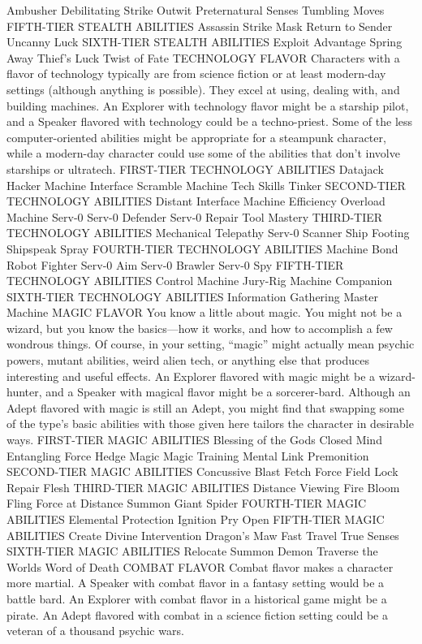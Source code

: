 Ambusher
Debilitating Strike
Outwit
Preternatural Senses
Tumbling Moves
FIFTH-TIER STEALTH ABILITIES
Assassin Strike
Mask
Return to Sender
Uncanny Luck
SIXTH-TIER STEALTH ABILITIES
Exploit Advantage
Spring Away
Thief’s Luck
Twist of Fate
TECHNOLOGY FLAVOR
Characters with a flavor of technology typically are from science fiction or at least modern-day
settings (although anything is possible). They excel at using, dealing with, and building machines. An Explorer with technology flavor might be a starship pilot, and a Speaker flavored with technology could be a techno-priest.
Some of the less computer-oriented abilities might be appropriate for a steampunk character, while a modern-day character could use some of the abilities that don’t involve starships or ultratech.
FIRST-TIER TECHNOLOGY ABILITIES
Datajack
Hacker
Machine Interface
Scramble Machine
Tech Skills
Tinker
SECOND-TIER TECHNOLOGY ABILITIES
Distant Interface
Machine Efficiency
Overload Machine
Serv-0
Serv-0 Defender
Serv-0 Repair
Tool Mastery
THIRD-TIER TECHNOLOGY ABILITIES
Mechanical Telepathy
Serv-0 Scanner
Ship Footing
Shipspeak
Spray
FOURTH-TIER TECHNOLOGY ABILITIES
Machine Bond
Robot Fighter
Serv-0 Aim
Serv-0 Brawler
Serv-0 Spy
FIFTH-TIER TECHNOLOGY ABILITIES
Control Machine
Jury-Rig
Machine Companion 
SIXTH-TIER TECHNOLOGY ABILITIES
Information Gathering
Master Machine
MAGIC FLAVOR
You know a little about magic. You might not be a wizard, but you know the basics—how it works, and how to accomplish a few wondrous things. Of course, in your setting, “magic” might actually mean psychic powers, mutant abilities, weird alien tech, or anything else that produces interesting and useful effects. 
An Explorer flavored with magic might be a wizard-hunter, and a Speaker with magical flavor might be a sorcerer-bard. Although an Adept flavored with magic is still an Adept, you might find that swapping some of the type’s basic abilities with those given here tailors the character in desirable ways.
FIRST-TIER MAGIC ABILITIES
Blessing of the Gods
Closed Mind
Entangling Force
Hedge Magic
Magic Training
Mental Link
Premonition
SECOND-TIER MAGIC ABILITIES
Concussive Blast
Fetch
Force Field 
Lock
Repair Flesh
THIRD-TIER MAGIC ABILITIES
Distance Viewing
Fire Bloom
Fling
Force at Distance
Summon Giant Spider
FOURTH-TIER MAGIC ABILITIES
Elemental Protection
Ignition
Pry Open
FIFTH-TIER MAGIC ABILITIES
Create
Divine Intervention
Dragon’s Maw
Fast Travel
True Senses
SIXTH-TIER MAGIC ABILITIES
Relocate
Summon Demon
Traverse the Worlds
Word of Death
COMBAT FLAVOR
Combat flavor makes a character more martial. A Speaker with combat flavor in a fantasy setting would be a battle bard. An Explorer with combat flavor in a historical game might be a pirate. An Adept flavored with combat in a science fiction setting could be a veteran of a thousand psychic wars.
